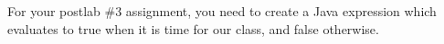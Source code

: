 For your postlab \#3 assignment, you need to create a Java expression which evaluates to true when it is time for our class, and false otherwise. 

